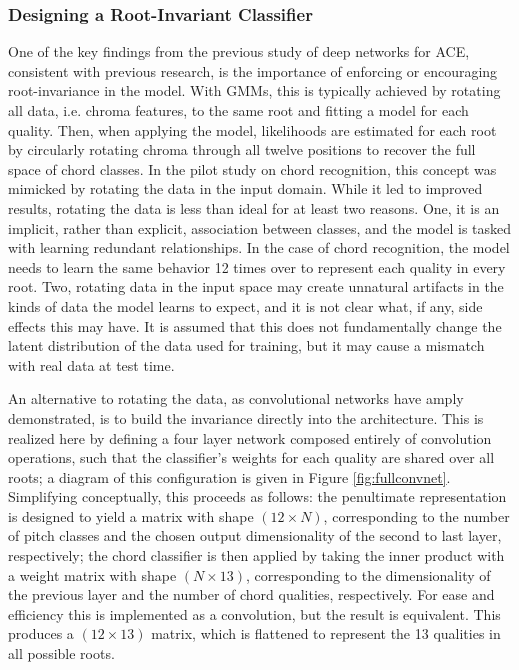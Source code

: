 \subsubsection{Designing a Root-Invariant Classifier}
\label{subsubsec:root_invariance}
One of the key findings from the previous study of deep networks for ACE, consistent with previous research, is the importance of enforcing or encouraging root-invariance in the model.
With GMMs, this is typically achieved by rotating all data, i.e. chroma features, to the same root and fitting a model for each quality.
Then, when applying the model, likelihoods are estimated for each root by circularly rotating chroma through all twelve positions to recover the full space of chord classes.
In the pilot study on chord recognition, this concept was mimicked by rotating the data in the input domain.
While it led to improved results, rotating the data is less than ideal for at least two reasons.
One, it is an implicit, rather than explicit, association between classes, and the model is tasked with learning redundant relationships.
In the case of chord recognition, the model needs to learn the same behavior 12 times over to represent each quality in every root.
Two, rotating data in the input space may create unnatural artifacts in the kinds of data the model learns to expect, and it is not clear what, if any, side effects this may have.
It is assumed that this does not fundamentally change the latent distribution of the data used for training, but it may cause a mismatch with real data at test time.

An alternative to rotating the data, as convolutional networks have amply demonstrated, is to build the invariance directly into the architecture.
This is realized here by defining a four layer network composed entirely of convolution operations, such that the classifier's weights for each quality are shared over all roots; a diagram of this configuration is given in Figure \ref{fig:fullconvnet}.
Simplifying conceptually, this proceeds as follows: the penultimate representation is designed to yield a matrix with shape $(12 \times N)$, corresponding to the number of pitch classes and the chosen output dimensionality of the second to last layer, respectively; the chord classifier is then applied by taking the inner product with a weight matrix with shape $(N \times 13)$, corresponding to the dimensionality of the previous layer and the number of chord qualities, respectively.
For ease and efficiency this is implemented as a convolution, but the result is equivalent.
This produces a $(12 \times 13)$ matrix, which is flattened to represent the 13 qualities in all possible roots.

